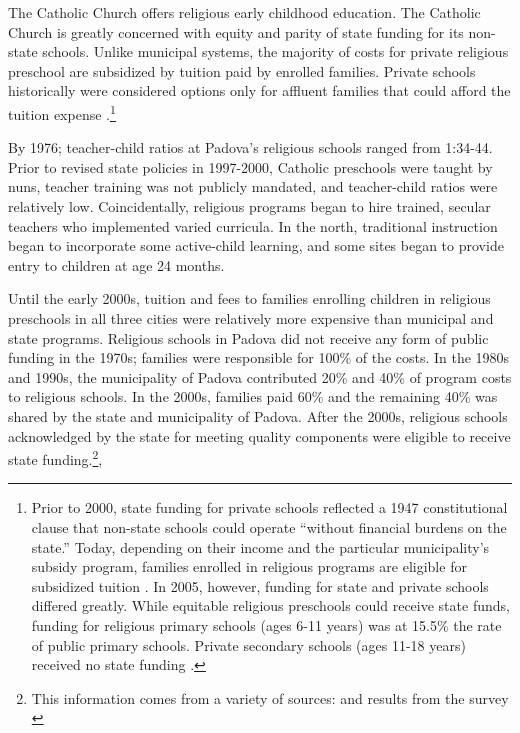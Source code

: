 The Catholic Church offers religious early childhood education. The Catholic Church is greatly concerned with equity and parity of state funding for its non-state schools. Unlike municipal systems, the majority of costs for private religious preschool are subsidized by tuition paid by enrolled families. Private schools historically were considered options only for affluent families that could afford the tuition expense \citep{Hohnerlein_2009_Paradox-Public-Preschools}.\footnote{Prior to 2000, state funding for private schools reflected a 1947 constitutional clause that non-state schools could operate ``without financial burdens on the state.'' Today, depending on their income and the particular municipality's subsidy program, families enrolled in religious programs are eligible for subsidized tuition \citep{Hohnerlein_2009_Paradox-Public-Preschools}. In 2005, however, funding for state and private schools differed greatly. While equitable religious preschools could receive state funds, funding for religious primary schools (ages 6-11 years) was at 15.5\% the rate of public primary schools. Private secondary schools (ages 11-18 years) received no state funding \citep{Becchi-Ferrari_1990_Pub-Inf-Centres-Italy}.}

By 1976; teacher-child ratios at Padova's religious schools ranged from 1:34-44. Prior to revised state policies in 1997-2000, Catholic preschools were taught by nuns, teacher training was not publicly mandated, and teacher-child ratios were relatively low. Coincidentally, religious programs began to hire trained, secular teachers who implemented varied curricula. In the north, traditional instruction began to incorporate some active-child learning, and some sites began to provide entry to children at age 24 months.

Until the early 2000s, tuition and fees to families enrolling children in religious preschools in all three cities were relatively more expensive than municipal and state programs. Religious schools in Padova did not receive any form of public funding in the 1970s; families were responsible for 100\% of the costs. In the 1980s and 1990s, the municipality of Padova contributed 20\% and 40\% of program costs to religious schools. In the 2000s, families paid 60\% and the remaining 40\% was shared by the state and municipality of Padova. After the 2000s, religious schools acknowledged by the state for meeting quality components were eligible to receive state funding.\footnote{This information comes from a variety of sources: \citet{Reggio-Admin-data_1966-2006, Reggio-Annual-Journals_1994-2011, Padova-Admin-Data_1964-2011} and results from the survey \citep{CEHD_2016_Historical-Analysis}},





